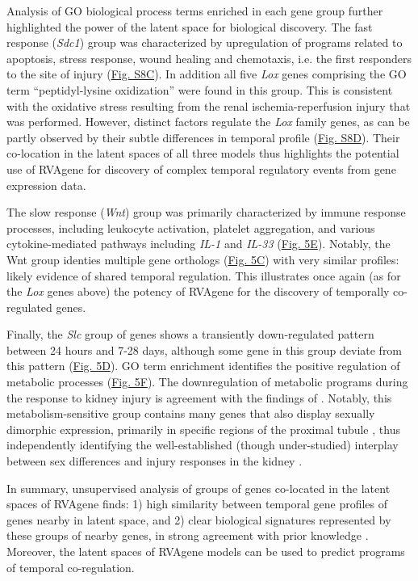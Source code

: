 \par 
Analysis of GO biological process terms enriched in each gene group further highlighted the power of the latent space for biological discovery. The fast response ({\em Sdc1}) group was characterized by upregulation of programs related to apoptosis, stress response, wound healing and chemotaxis, i.e. the first responders to the site of injury (\hyperref[supp]{Fig. S8C}). In addition all five {\em Lox} genes comprising the GO term ``peptidyl-lysine oxidization'' were found in this group. This is consistent with the oxidative stress resulting from the renal ischemia-reperfusion injury that was performed. However, distinct factors regulate the {\em Lox} family genes, as can be partly observed by their subtle differences in temporal profile (\hyperref[supp]{Fig. S8D}). Their co-location in the latent spaces of all three models thus highlights the potential use of RVAgene for discovery of complex temporal regulatory events from gene expression data.
\par
The slow response ({\em Wnt}) group was primarily characterized by immune response processes, including leukocyte activation, platelet aggregation, and various cytokine-mediated pathways including {\em IL-1} and {\em IL-33} (\hyperref[fig:fig6b]{Fig. 5E}). Notably, the Wnt group identies multiple gene orthologs (\hyperref[fig:fig6b]{Fig. 5C}) with very similar profiles: likely evidence of shared temporal regulation. This illustrates once again (as for the {\em Lox} genes above) the potency of RVAgene for the discovery of temporally co-regulated genes.
\par
Finally, the {\em Slc} group of genes shows a transiently down-regulated pattern between 24 hours and 7-28 days, although some gene in this group deviate from this pattern (\hyperref[fig:fig6b]{Fig. 5D}). 
GO term enrichment identifies the positive regulation of metabolic processes (\hyperref[fig:fig6b]{Fig. 5F}). The downregulation of metabolic programs during the response to kidney injury is agreement with the findings of \citet{liu2017molecular}. Notably, this metabolism-sensitive group contains many genes that also display sexually dimorphic expression, primarily in specific regions of the proximal tubule \citep{ransick19_singlecell}, thus independently identifying the well-established (though under-studied) interplay between sex differences and injury responses in the kidney \citep{neugarten00_effect}. 
\par 
In summary, unsupervised analysis of groups of genes co-located in the latent spaces of RVAgene finds: 1) high similarity between temporal gene profiles of genes nearby in latent space, and 2) clear biological signatures represented by these groups of nearby genes, in strong agreement with prior knowledge \citep{liu2017molecular}. Moreover, the latent spaces of RVAgene models can be used to predict programs of temporal co-regulation. 
\par


